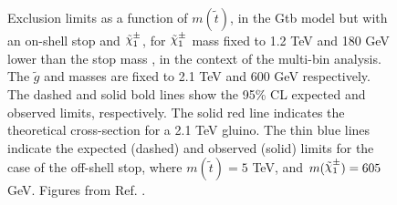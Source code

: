 \begin{figure}
  \centering
  \caption{Exclusion limits as a function of $m(\tilde{t})$, in the Gtb model but with an on-shell stop and $\chinoonepm$, 
  for $\chinoonepm$ mass fixed to 1.2 TeV  and 180 GeV lower than the stop mass ,
  in the context of the multi-bin analysis. The $\tilde{g}$ and \ninoone masses are fixed to 2.1 TeV and 600 GeV respectively.   
  The dashed and solid bold lines  show the 95\% CL expected and observed limits, respectively.    
  The solid red line indicates the theoretical cross-section for a 2.1 TeV gluino. 
  The thin blue lines indicate the expected (dashed) and observed (solid) limits for the case of the off-shell stop, where $m(\tilde{t}) = 5$ TeV, and $m(\chinoonepm) = 605$ GeV.
  Figures from Ref. \cite{ATLAS-CONF-2018-041}.}
  \label{fig:limits_GtbOnshell}
\end{figure}
